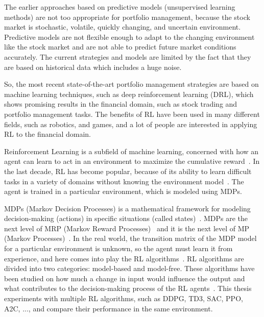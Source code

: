 The earlier approaches based on predictive models (unsupervised learning methods) are not too appropriate for portfolio management, because the stock market is stochastic, volatile, quickly changing, and uncertain environment.
Predictive models are not flexible enough to adapt to the changing environment like the stock market and are not able to predict future market conditions accurately.
The current strategies and models are limited by the fact that they are based on historical data which includes a huge noise.

So, the most recent state-of-the-art portfolio management strategies are based on machine learning techniques, such as deep reinforcement learning (DRL), which shows promising results in the financial domain, such as stock trading and portfolio management tasks.
The benefits of RL have been used in many different fields, such as robotics, and games, and a lot of people are interested in applying RL to the financial domain.

Reinforcement Learning is a subfield of machine learning, concerned with how an agent can learn to act in an environment to maximize the cumulative reward~\cite{Model-Free-Reinforcement-Learning-for-Asset-Allocation}.
In the last decade, RL has become popular, because of its ability to learn difficult tasks in a variety of domains without knowing the environment model~\cite{sutton-2018}.
The agent is trained in a particular environment, which is modeled using MDPs.

MDPs (Markov Decision Processes) is a mathematical framework for modeling decision-making (actions) in specific situations (called states)~\cite[p.~93]{rao-2022}.
MDPs are the next level of MRP (Markov Reward Processes)~\cite[p.~84]{rao-2022} and it is the next level of MP (Markov Processes)~\cite[p.~59]{rao-2022}.
In the real world, the transition matrix of the MDP model for a particular environment is unknown, so the agent must learn it from experience, and here comes into play the RL algorithms~\cite{sutton-2018}.
RL algorithms are divided into two categories: model-based\cite{rl-model-based} and model-free\cite{rl-model-free}.
These algorithms have been studied on how much a change in input would influence the output and what contributes to the decision-making process of the RL agents~\cite{finrl-portfolio-allocation-2020}.
This thesis experiments with multiple RL algorithms, such as DDPG, TD3, SAC, PPO, A2C, ..., and compare their performance in the same environment.


